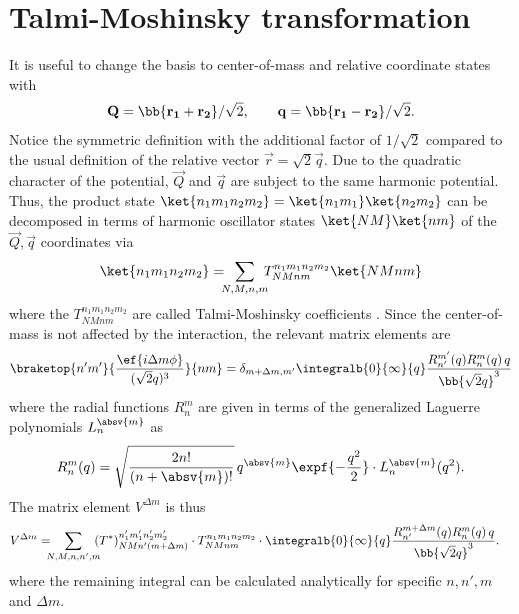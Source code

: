 \section{Talmi-Moshinsky transformation}
It is useful to change the basis to center-of-mass and relative coordinate states with
\begin{align*}
\vec{Q} = \bb{\vec{r_1} + \vec{r_2}}/\sqrt{2}, \qquad \vec{q} = \bb{\vec{r_1} - \vec{r_2}}/\sqrt{2}.
\end{align*}
Notice the symmetric definition with the additional factor of $1/\sqrt{2}$ compared to the usual definition of the relative vector $\vec{r} = \sqrt{2} \vec{q}$.
Due to the quadratic character of the potential, $\vec{Q}$ and $\vec{q}$ are subject to the same harmonic potential. Thus, the product state $\ket{n_1m_1n_2m_2}=\ket{n_1m_1}\ket{n_2m_2}$ can be decomposed in terms of harmonic oscillator states $\ket{NM}\ket{nm}$ of the $\vec{Q},\vec{q}$ coordinates via
\begin{align*}
\ket{n_1m_1n_2m_2} = \!\!\! \sum_{N,M,n,m} \!\!\! T^{n_1m_1n_2m_2}_{NMnm} \ket{NMnm}
\end{align*}
where the $T^{n_1m_1n_2m_2}_{NMnm}$ are called Talmi-Moshinsky coefficients \cite{Moshinsky1959,Talmi1952}. Since the center-of-mass is not affected by the interaction, the relevant matrix elements are
\begin{align*}
\braketop{n'm'}{\frac{\ef{i\Delta m \phi}}{(\sqrt{2} q)^3}}{nm} = \delta_{m+\Delta m,m'} \integralb{0}{\infty}{q} \frac{R_{n'}^{m'}(q) R_n^m(q) \,q}{\bb{\sqrt{2} q}^3}
\end{align*}
where the radial functions $R_n^m$ are given in terms of the generalized Laguerre polynomials $L_n^{\absv{m}}$ as
\begin{align*}
R_n^m(q) = \sqrt{\frac{2n!}{(n+\absv{m})!}}\, q^{\absv{m}}\expf{-\frac{q^2}{2}}\cdot L_n^{\absv{m}}(q^2).
\end{align*}
The matrix element $V^{\Delta m}$ is thus
\begin{align*}
V^{\Delta m}= \!\!\! &\sum_{N,M,n,n',m} \!\!\! (T^*)^{n_1'm_1'n_2'm_2'}_{NMn'(m+\Delta m)} \cdot T^{n_1m_1n_2m_2}_{NMnm} \cdot
 \integralb{0}{\infty}{q} \frac{R_{n'}^{m+\Delta m}(q) R_n^m(q) \,q}{\bb{\sqrt{2} q}^3}.
\end{align*}
where the remaining integral can be calculated analytically for specific $n,n',m$ and $\Delta m$.

